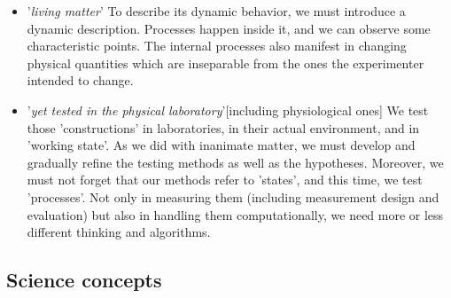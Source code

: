 \begin{itemize}
We are accustomed to abstracting and testing a static attribute, and we derive the 'ordinary' laws of motion for the 'net' interactions.
In the case of physiology, nature prevents us from testing 'net' interactions.
We must understand that some interactions are non-separable, and we must derive 'extraordinary' laws.
The forces are not unknown, but the known 'ordinary' laws of motion of physics are about single-speed interactions.
\item '\textit{living matter}' To describe its dynamic behavior, we must introduce a dynamic description. Processes happen inside it, and we can observe some characteristic points.  
The internal processes also manifest in changing physical quantities
which are inseparable from the ones the experimenter intended to change. 

\item '\textit{yet tested in the physical laboratory}'[including physiological ones] We test those 'constructions' in laboratories,
in their actual environment, and in 'working state'. As we did with inanimate matter, we must develop and gradually refine the testing methods as well as the hypotheses.
Moreover, we must not forget that our methods refer to 'states', and this time, we test 'processes'. Not only in measuring them  (including measurement design and evaluation) but also in handling them computationally, we need more or less different thinking and algorithms.
\end{itemize}




\subsection[Concepts]{Science concepts\label{sec:Physics-ScienceConcepts}}


